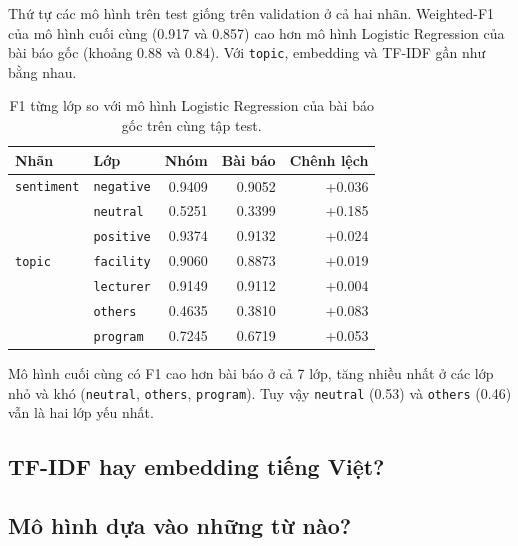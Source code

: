 Thứ tự các mô hình trên test giống trên validation ở cả hai nhãn. Weighted-F1 của mô hình cuối cùng (0.917 và 0.857) cao
hơn mô hình Logistic Regression của bài báo gốc (khoảng 0.88 và 0.84). Với \texttt{topic}, embedding và TF-IDF gần như bằng
nhau.


\begin{table}[H]\centering
\caption{F1 từng lớp so với mô hình Logistic Regression của bài báo gốc trên cùng tập test.}\label{tab:text-perclass}
\begin{tabular}{llrrr}
\toprule
Nhãn & Lớp & Nhóm & Bài báo & Chênh lệch \\
\midrule
\texttt{sentiment} & \texttt{negative} & 0.9409 & 0.9052 & +0.036 \\
 & \texttt{neutral} & 0.5251 & 0.3399 & +0.185 \\
 & \texttt{positive} & 0.9374 & 0.9132 & +0.024 \\
\midrule
\texttt{topic} & \texttt{facility} & 0.9060 & 0.8873 & +0.019 \\
 & \texttt{lecturer} & 0.9149 & 0.9112 & +0.004 \\
 & \texttt{others} & 0.4635 & 0.3810 & +0.083 \\
 & \texttt{program} & 0.7245 & 0.6719 & +0.053 \\
\bottomrule
\end{tabular}
\end{table}

Mô hình cuối cùng có F1 cao hơn bài báo ở cả 7 lớp, tăng nhiều nhất ở các lớp nhỏ và khó (\texttt{neutral},
\texttt{others}, \texttt{program}). Tuy vậy \texttt{neutral} (0.53) và \texttt{others} (0.46) vẫn là hai lớp yếu nhất.

\subsection{TF-IDF hay embedding tiếng Việt?}


\subsection{Mô hình dựa vào những từ nào?}

